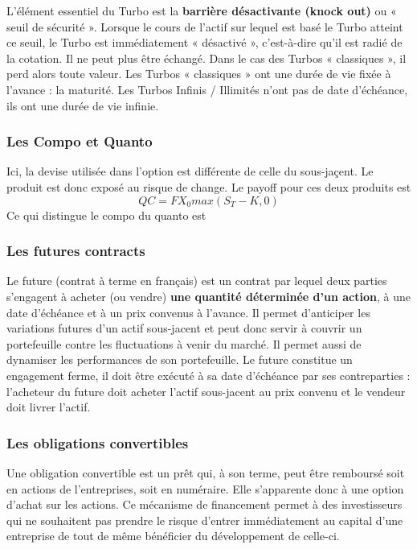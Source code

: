 \documentclass[a4paper]{article}
\begin{document}
L’élément essentiel du Turbo est la \textbf{barrière désactivante (knock out)} ou « seuil de sécurité ». Lorsque le cours de l’actif sur lequel est basé le Turbo atteint ce seuil, le Turbo est immédiatement « désactivé », c’est-à-dire qu’il est radié de la cotation. Il ne peut plus être échangé. Dans le cas des Turbos « classiques », il perd alors toute valeur. Les Turbos « classiques » ont une durée de vie fixée à l’avance : la maturité. Les Turbos Infinis / Illimités n’ont pas de date d’échéance, ils ont une durée de vie infinie.

\subsubsection{Les Compo et Quanto}

Ici, la devise utilisée dans l'option est différente de celle du sous-jaçent. Le produit est donc exposé au risque de change. Le payoff pour ces deux produits est
\begin{equation*}
    QC = FX_0 max(S_T - K, 0)
\end{equation*}
Ce qui distingue le compo du quanto est 

\subsubsection{Les futures contracts}

Le future (contrat à terme en français) est un contrat par lequel deux parties s’engagent à acheter (ou vendre) \textbf{une quantité déterminée d’un action}, à une date d’échéance et à un prix convenus à l’avance. Il permet d’anticiper les variations futures d’un actif sous-jacent et peut donc servir à couvrir un portefeuille contre les fluctuations à venir du marché. Il permet aussi de dynamiser les performances de son portefeuille. Le future constitue un engagement ferme, il doit être exécuté à sa date d’échéance par ses contreparties : l’acheteur du future doit acheter l’actif sous-jacent au prix convenu et le vendeur doit livrer l’actif.

\subsubsection{Les obligations convertibles}

Une obligation convertible est un prêt qui, à son terme, peut être remboursé soit en actions de l’entreprises, soit en numéraire. Elle s’apparente donc à une option d’achat sur les actions.
\vspace{2mm}
Ce mécanisme de financement permet à des investisseurs qui ne souhaitent pas prendre le risque d’entrer immédiatement au capital d’une entreprise de tout de même bénéficier du développement de celle-ci.
\end{document}
